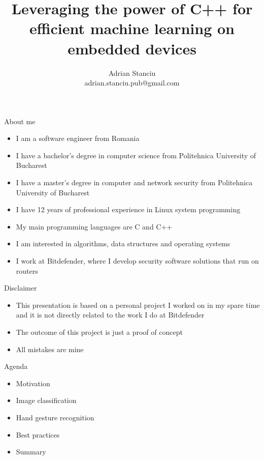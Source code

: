 \documentclass{beamer}
\title{Leveraging the power of C++ for efficient machine learning on embedded
devices}
\subtitle{}
\author{Adrian Stanciu\\{\small adrian.stanciu.pub@gmail.com}}
\date{}
\institute{NDC TechTown, 2023}
\begin{document}
\frame{\titlepage}

\begin{frame}{About me}
  \begin{itemize}
	\item I am a software engineer from Romania
	\item I have a bachelor's degree in computer science from Politehnica
	University of Bucharest
	\item I have a master's degree in computer and network security from
	Politehnica University of Bucharest
	\item I have 12 years of professional experience in Linux system
	programming
	\item My main programming languages are C and C++
	\item I am interested in algorithms, data structures and operating systems
	\item I work at Bitdefender, where I develop security software solutions
	that run on routers
  \end{itemize}
\end{frame}

\begin{frame}{Disclaimer}
  \begin{itemize}
	\item This presentation is based on a personal project I worked on in my
	spare time and it is not directly related to the work I do at Bitdefender
	\item The outcome of this project is just a proof of concept
	\item All mistakes are mine
  \end{itemize}
\end{frame}

\begin{frame}{Agenda}
  \begin{itemize}
	\item Motivation
	\item Image classification
	\item Hand gesture recognition
	\item Best practices
	\item Summary
  \end{itemize}
\end{frame}






\end{document}
